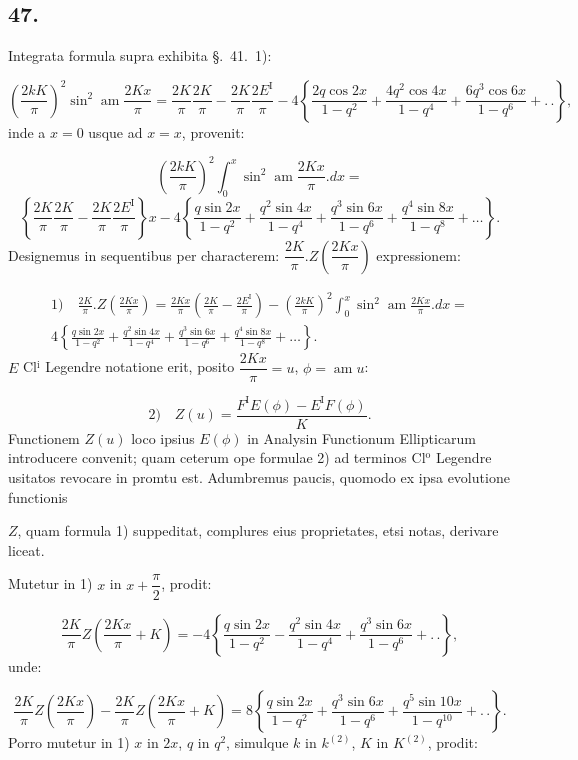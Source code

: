 \documentclass{article}
\begin{document}
\subsection*{47.}

Integrata formula supra exhibita §.\ 41.\ 1):

\[
\left(\frac{2kK}{\pi}\right)^{2}\sin^{2}\operatorname{am}\frac{2Kx}{\pi}=\frac{2K}{\pi}\frac{2K}{\pi}-\frac{2K}{\pi}\frac{2E^{\mathrm{I}}}{\pi}-4\left\{\frac{2q\cos2x}{1-q^{2}}+\frac{4q^{2}\cos4x}{1-q^{4}}+\frac{6q^{3}\cos6x}{1-q^{6}}+.\,.\right\},
\]
inde a $x=0$ usque ad $x=x$, provenit:

\[
\left(\frac{2kK}{\pi}\right)^{2}\int_{0}^{x}\sin^{2}\operatorname{am}\frac{2Kx}{\pi}.dx=
\]
\[
\left\{\frac{2K}{\pi}\frac{2K}{\pi}-\frac{2K}{\pi}\frac{2E^{\mathrm{I}}}{\pi}\right\}x-4\left\{\frac{q\sin2x}{1-q^{2}}+\frac{q^{2}\sin4x}{1-q^{4}}+\frac{q^{3}\sin6x}{1-q^{6}}+\frac{q^{4}\sin8x}{1-q^{8}}+\ldots\right\}.
\]
Designemus in sequentibus per characterem: $\dfrac{2K}{\pi}.Z\left(\dfrac{2Kx}{\pi}\right)$ expressionem:

\[
\begin{gathered}
\text{1)}\quad\frac{2K}{\pi}.Z\left(\frac{2Kx}{\pi}\right)=\frac{2Kx}{\pi}\left(\frac{2K}{\pi}-\frac{2E^{\mathrm{I}}}{\pi}\right)-\left(\frac{2kK}{\pi}\right)^{2}\int_{0}^{x}\sin^{2}\operatorname{am}\frac{2Kx}{\pi}.dx=\\[1ex]
4\left\{\frac{q\sin2x}{1-q^{2}}+\frac{q^{2}\sin4x}{1-q^{4}}+\frac{q^{3}\sin6x}{1-q^{6}}+\frac{q^{4}\sin8x}{1-q^{8}}+\ldots\right\}.
\end{gathered}
\]
$E$ Cl$^{\mathrm{i}}$ Legendre notatione erit, posito $\dfrac{2Kx}{\pi}=u$, $\phi=\operatorname{am}u$:

\[
\text{2)}\quad Z(u)=\frac{F^{\mathrm{I}}E(\phi)-E^{\mathrm{I}}F(\phi)}{K}.
\]
Functionem $Z(u)$ loco ipsius $E(\phi)$ in Analysin Functionum Ellipticarum introducere convenit; quam ceterum ope formulae 2) ad terminos Cl$^{\mathrm{o}}$ Legendre usitatos revocare in promtu est. Adumbremus paucis, quomodo ex ipsa evolutione functionis

$Z$, quam formula 1) suppeditat, complures eius proprietates, etsi notas, derivare liceat.

Mutetur in 1) $x$ in $x+\dfrac{\pi}{2}$, prodit:

\[
\frac{2K}{\pi}Z\left(\frac{2Kx}{\pi}+K\right)=-4\left\{\frac{q\sin2x}{1-q^{2}}-\frac{q^{2}\sin4x}{1-q^{4}}+\frac{q^{3}\sin6x}{1-q^{6}}+.\,.\right\},
\]
unde:

\[
\frac{2K}{\pi}Z\left(\frac{2Kx}{\pi}\right)-\frac{2K}{\pi}Z\left(\frac{2Kx}{\pi}+K\right)=8\left\{\frac{q\sin2x}{1-q^{2}}+\frac{q^{3}\sin6x}{1-q^{6}}+\frac{q^{5}\sin10x}{1-q^{10}}+.\,.\right\}.
\]
Porro mutetur in 1) $x$ in $2x$, $q$ in $q^{2}$, simulque $k$ in $k^{(2)}$, $K$ in $K^{(2)}$, prodit:
\end{document}
